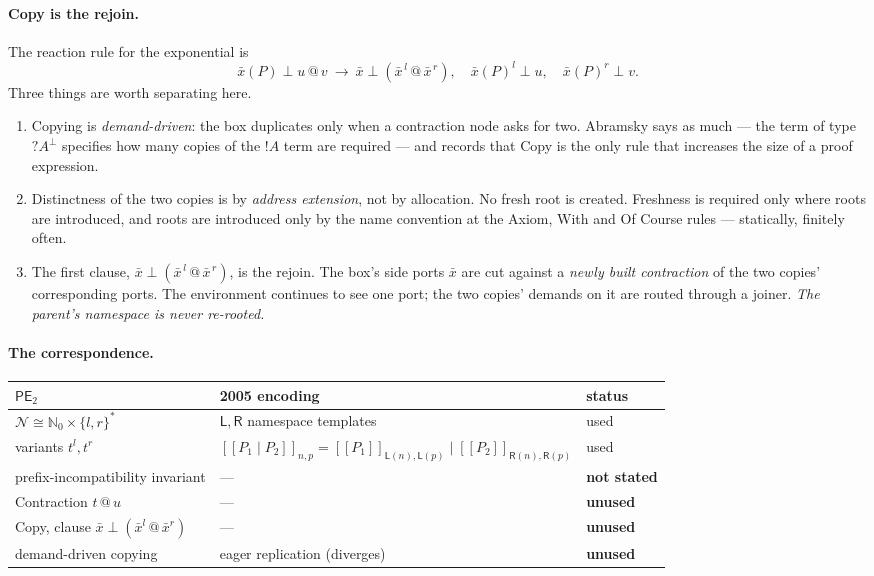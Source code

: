 \documentclass[11pt]{article}
\theoremstyle{definition}
\theoremstyle{plain}
\theoremstyle{remark}
\newcommand{\enc}[1]{[\![#1]\!]}
\newcommand{\Lft}{\mathsf{L}}
\newcommand{\Rgt}{\mathsf{R}}
\begin{document}
\paragraph{Copy is the rejoin.}
The reaction rule for the exponential is
\[
  \bar x(P) \perp u \mathbin{@} v
  \ \longrightarrow\
  \bar x \perp (\bar x^{\,l} \mathbin{@} \bar x^{\,r}),\quad
  \bar x(P)^l \perp u,\quad
  \bar x(P)^r \perp v .
\]
Three things are worth separating here.
\begin{enumerate}[label=(\roman*),leftmargin=2.2em]
\item Copying is \emph{demand-driven}: the box duplicates only when a
contraction node asks for two. Abramsky says as much --- the term of type
$?A^\perp$ specifies how many copies of the $!A$ term are required --- and
records that Copy is the only rule that increases the size of a proof
expression.
\item Distinctness of the two copies is by \emph{address extension}, not
by allocation. No fresh root is created. Freshness is required only where
roots are introduced, and roots are introduced only by the name
convention at the Axiom, With and Of Course rules --- statically, finitely
often.
\item The first clause, $\bar x \perp (\bar x^{\,l} \mathbin{@} \bar
x^{\,r})$, is the rejoin. The box's side ports $\bar x$ are cut against a
\emph{newly built contraction} of the two copies' corresponding ports.
The environment continues to see one port; the two copies' demands on it
are routed through a joiner. \emph{The parent's namespace is never
re-rooted.}
\end{enumerate}

\paragraph{The correspondence.}
\begin{center}
\begin{tabular}{@{}lll@{}}
\toprule
$\mathsf{PE}_2$ & 2005 encoding & status \\
\midrule
$\mathcal{N} \cong \mathbb{N}_0 \times \{l,r\}^*$ & $\Lft, \Rgt$ namespace templates & used \\
variants $t^l, t^r$ & $\enc{P_1 \mid P_2}_{n,p} = \enc{P_1}_{\Lft(n),\Lft(p)} \mid \enc{P_2}_{\Rgt(n),\Rgt(p)}$ & used \\
prefix-incompatibility invariant & --- & \textbf{not stated} \\
Contraction $t \mathbin{@} u$ & --- & \textbf{unused} \\
Copy, clause $\bar x \perp (\bar x^l \mathbin{@} \bar x^r)$ & --- & \textbf{unused} \\
demand-driven copying & eager replication (diverges) & \textbf{unused} \\
\bottomrule
\end{tabular}
\end{center}
\end{document}
